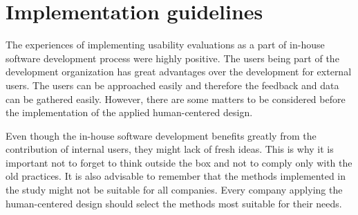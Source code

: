 \documentclass[12pt,a4paper,oneside,pdftex]{report}
\begin{document}








\section{Implementation guidelines}
\label{sec:implementationguidelines}

The experiences of implementing usability evaluations as a part of in-house software development process were highly positive. The users being part of the development organization has great advantages over the development for external users. The users can be approached easily and therefore the feedback and data can be gathered easily. However, there are some matters to be considered before the implementation of the applied human-centered design. 

Even though the in-house software development benefits greatly from the contribution of internal users, they might lack of fresh ideas. This is why it is important not to forget to think outside the box and not to comply only with the old practices.  
It is also advisable to remember that the methods implemented in the study might not be suitable for all companies. Every company applying the human-centered design should select the methods most suitable for their needs. 
\end{document}
